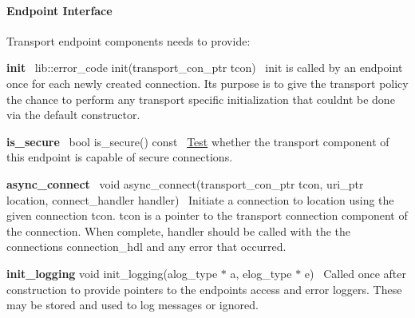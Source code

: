 \paragraph*{Endpoint Interface}

Transport endpoint components needs to provide\+:

{\bfseries init}~\newline
{\ttfamily lib\+::error\+\_\+code init(transport\+\_\+con\+\_\+ptr tcon)}~\newline
init is called by an endpoint once for each newly created connection. It\textquotesingle{}s purpose is to give the transport policy the chance to perform any transport specific initialization that couldn\textquotesingle{}t be done via the default constructor.

{\bfseries is\+\_\+secure}~\newline
{\ttfamily bool is\+\_\+secure() const}~\newline
\mbox{\hyperlink{struct_test}{Test}} whether the transport component of this endpoint is capable of secure connections.

{\bfseries async\+\_\+connect}~\newline
{\ttfamily void async\+\_\+connect(transport\+\_\+con\+\_\+ptr tcon, uri\+\_\+ptr location, connect\+\_\+handler handler)}~\newline
Initiate a connection to {\ttfamily location} using the given connection {\ttfamily tcon}. {\ttfamily tcon} is a pointer to the transport connection component of the connection. When complete, {\ttfamily handler} should be called with the the connection\textquotesingle{}s {\ttfamily connection\+\_\+hdl} and any error that occurred.

{\bfseries init\+\_\+logging} {\ttfamily void init\+\_\+logging(alog\+\_\+type $\ast$ a, elog\+\_\+type $\ast$ e)}~\newline
Called once after construction to provide pointers to the endpoint\textquotesingle{}s access and error loggers. These may be stored and used to log messages or ignored. 